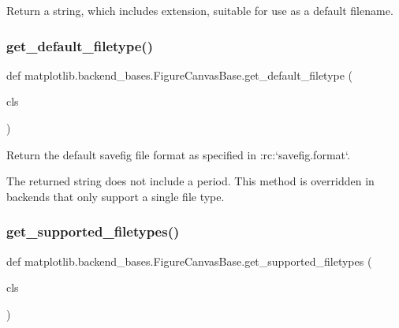\begin{DoxyVerb}Return a string, which includes extension, suitable for use as
a default filename.
\end{DoxyVerb}
 \mbox{\label{classmatplotlib_1_1backend__bases_1_1FigureCanvasBase_ab5e20184eb2d8f7c54dd90ada025a970}} 
\subsubsection{\texorpdfstring{get\+\_\+default\+\_\+filetype()}{get\_default\_filetype()}}
{\footnotesize\ttfamily def matplotlib.\+backend\+\_\+bases.\+Figure\+Canvas\+Base.\+get\+\_\+default\+\_\+filetype (\begin{DoxyParamCaption}\item[{}]{cls }\end{DoxyParamCaption})}

\begin{DoxyVerb}Return the default savefig file format as specified in
:rc:`savefig.format`.

The returned string does not include a period. This method is
overridden in backends that only support a single file type.
\end{DoxyVerb}
 \mbox{\label{classmatplotlib_1_1backend__bases_1_1FigureCanvasBase_aa11460e76b6d77d7bb916006d42d7244}} 
\subsubsection{\texorpdfstring{get\+\_\+supported\+\_\+filetypes()}{get\_supported\_filetypes()}}
{\footnotesize\ttfamily def matplotlib.\+backend\+\_\+bases.\+Figure\+Canvas\+Base.\+get\+\_\+supported\+\_\+filetypes (\begin{DoxyParamCaption}\item[{}]{cls }\end{DoxyParamCaption})}

